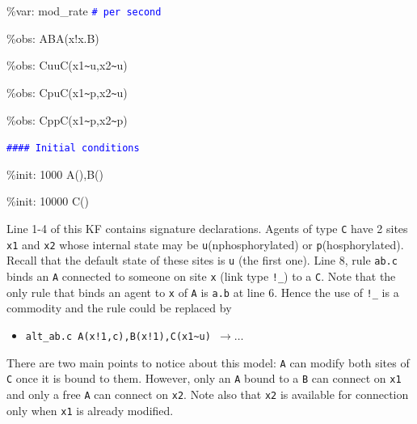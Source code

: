 \documentclass[11pt]{book}
\def\int{\hbox{\texttt{\~}}}
\def\tcb#1{\textcolor{blue}{\ttt{#1}}}
\def\ttt#1{\texttt{#1}}
\def\var#1{\textquotesingle #1\textquotesingle}
\def\rar{\rightarrow}
\def\ITE#1{\begin{itemize}#1\end{itemize}}
\begin{document}
{{{\item \%var: \textquotesingle mod\_rate \tcb{\# per second}
\item \%obs: \textquotesingle AB\textquotesingle  A(x!x.B)
\item \%obs: \textquotesingle Cuu\textquotesingle  C(x1\int u,x2\int u)
\item \%obs: \textquotesingle Cpu\textquotesingle  C(x1\int p,x2\int u)
\item \%obs: \textquotesingle Cpp\textquotesingle  C(x1\int p,x2\int p)
\item \tcb{\#\#\#\# Initial conditions}
\item \%init: 1000 A(),B()
\item \%init: 10000 C()
}
}}
%

Line 1-4 of this KF contains signature declarations. Agents of type \ttt{C} have 2 sites \ttt{x1} and \ttt{x2} whose internal state may be \ttt{u}(nphosphorylated) or \ttt{p}(hosphorylated). Recall that the default state of these sites is \ttt{u} (the first one). Line 8, rule \ttt{\textquotesingle ab.c\textquotesingle } binds an \ttt{A} connected to someone on site \ttt{x} (link type \ttt{!\_}) to a \ttt{C}. Note that the only rule that binds an agent to \ttt{x} of \ttt{A} is \ttt{\textquotesingle a.b\textquotesingle } at line 6. Hence the use of \ttt{!\_} is a commodity and the rule could be replaced by 
\ITE{
\item[]\ttt{\var{alt\_ab.c} A(x!1,c),B(x!1),C(x1\int u) $\rar\dots$}
}
There are two main points to notice about this model: \ttt{A} can modify both sites of \ttt{C} once it is bound to them. However, only an \ttt{A} bound to a \ttt{B} can connect on \ttt{x1} and only a free \ttt{A} can connect on \ttt{x2}. Note also that \ttt{x2} is available for connection only when \ttt{x1} is already modified. 
\end{document}
